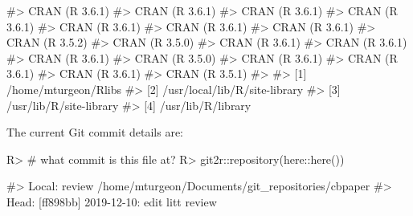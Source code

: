 \documentclass[
]{jss}
\begin{document}
\begin{CodeChunk}
\begin{CodeOutput}
#>  CRAN (R 3.6.1)                          
#>  CRAN (R 3.6.1)                          
#>  CRAN (R 3.6.1)                          
#>  CRAN (R 3.6.1)                          
#>  CRAN (R 3.6.1)                          
#>  CRAN (R 3.6.1)                          
#>  CRAN (R 3.6.1)                          
#>  CRAN (R 3.5.2)                          
#>  CRAN (R 3.5.0)                          
#>  CRAN (R 3.6.1)                          
#>  CRAN (R 3.6.1)                          
#>  CRAN (R 3.6.1)                          
#>  CRAN (R 3.5.0)                          
#>  CRAN (R 3.6.1)                          
#>  CRAN (R 3.6.1)                          
#>  CRAN (R 3.6.1)                          
#>  CRAN (R 3.5.1)                          
#> 
#> [1] /home/mturgeon/Rlibs
#> [2] /usr/local/lib/R/site-library
#> [3] /usr/lib/R/site-library
#> [4] /usr/lib/R/library
\end{CodeOutput}
\end{CodeChunk}

The current Git commit details are:

\begin{CodeChunk}

\begin{CodeInput}
R> # what commit is this file at? 
R> git2r::repository(here::here())
\end{CodeInput}

\begin{CodeOutput}
#> Local:    review /home/mturgeon/Documents/git_repositories/cbpaper
#> Head:     [ff898bb] 2019-12-10: edit litt review
\end{CodeOutput}
\end{CodeChunk}


\end{document}
